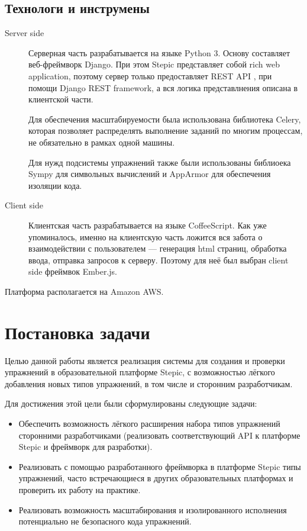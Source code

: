 \documentclass{matmex-diploma-custom}
\begin{document}
\subsection{Технологи и инструмены}
\begin{description}
\item[Server side] Серверная часть разрабатывается на языке Python
  3. Основу составляет веб-фреймворк Django. При этом Stepic
  представляет собой rich web application, поэтому сервер только
  предоставляет REST API \cite{rest}, при помощи Django REST
  framework, а вся логика представлнения описана в клиентской части.

  Для обеспечения масштабируемости была использована библиотека
  Celery, которая позволяет распределять выполнение заданий по многим
  процессам, не обязательно в рамках одной машины.

  Для нужд подсистемы упражнений также были использованы библиоека
  Sympy для символьных вычислений и AppArmor для обеспечения изоляции кода.
\item[Client side] Клиентская часть разрабатывается на языке
  CoffeeScript. Как уже упоминалось, именно на клиентскую часть
  ложится вся забота о взаимодействии с пользователем --- генерация
  html страниц, обработка ввода, отправка запросов к серверу. Поэтому
  для неё был выбран client side фреймвок Ember.js.
\end{description}

Платформа располагается на Amazon AWS.
\section{Постановка задачи}
Целью данной работы является реализация системы для создания и проверки
упражнений в образовательной платформе Stepic, с возможностью лёгкого
добавления новых типов упражнений, в том числе и сторонним
разработчикам.

Для достижения этой цели были сформулированы следующие задачи:

\begin{itemize}
\item Обеспечить возможность лёгкого расширения набора типов
  упражнений сторонними разработчиками (реализовать соответствующий
  API к платформе Stepic и фреймворк для разработки).
\item Реализовать с помощью разработанного фреймворка в платформе
  Stepic типы упражнений, часто встречающиеся в других образовательных
  платформах и проверить их работу на практике.
\item Реализовать возможность масштабирования и изолированного
  исполнения потенциально не безопасного кода упражнений.
\end{itemize}
\end{document}
